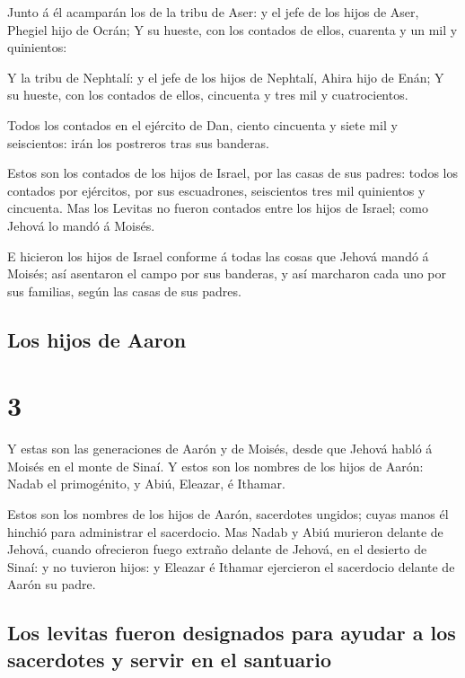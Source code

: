  Junto á él acamparán los de la tribu de Aser: y el jefe
de los hijos de Aser, Phegiel hijo de Ocrán;  Y su
hueste, con los contados de ellos, cuarenta y un mil y quinientos:

 Y la tribu de Nephtalí: y el jefe de los hijos de
Nephtalí, Ahira hijo de Enán;  Y su hueste, con los
contados de ellos, cincuenta y tres mil y cuatrocientos.

 Todos los contados en el ejército de Dan, ciento
cincuenta y siete mil y seiscientos: irán los postreros tras sus
banderas.

 Estos son los contados de los hijos de Israel, por las
casas de sus padres: todos los contados por ejércitos, por sus
escuadrones, seiscientos tres mil quinientos y cincuenta.
 Mas los Levitas no fueron contados entre los hijos de
Israel; como Jehová lo mandó á Moisés.

 E hicieron los hijos de Israel conforme á todas las
cosas que Jehová mandó á Moisés; así asentaron el campo por sus
banderas, y así marcharon cada uno por sus familias, según las casas de
sus padres.

\hypertarget{los-hijos-de-aaron}{%
\subsection{Los hijos de Aaron}\label{los-hijos-de-aaron}}

\hypertarget{section-2}{%
\section{3}\label{section-2}}

 Y estas son las generaciones de Aarón y de Moisés, desde
que Jehová habló á Moisés en el monte de Sinaí.  Y estos
son los nombres de los hijos de Aarón: Nadab el primogénito, y Abiú,
Eleazar, é Ithamar.

 Estos son los nombres de los hijos de Aarón, sacerdotes
ungidos; cuyas manos él hinchió para administrar el sacerdocio.
 Mas Nadab y Abiú murieron delante de Jehová, cuando
ofrecieron fuego extraño delante de Jehová, en el desierto de Sinaí: y
no tuvieron hijos: y Eleazar é Ithamar ejercieron el sacerdocio delante
de Aarón su padre.

\hypertarget{los-levitas-fueron-designados-para-ayudar-a-los-sacerdotes-y-servir-en-el-santuario}{%
\subsection{Los levitas fueron designados para ayudar a los sacerdotes y
servir en el
santuario}\label{los-levitas-fueron-designados-para-ayudar-a-los-sacerdotes-y-servir-en-el-santuario}}

